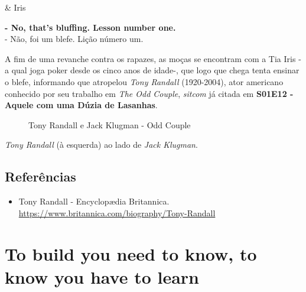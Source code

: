 \begin{tcolorbox}[enhanced,center upper,
    drop fuzzy shadow southeast, boxrule=0.3pt,
    lower separated=false, breakable,
    colframe=black!30!dialogoBorder,colback=white]
\medskip
\begin{minipage}[c]{0.16\linewidth}
   & \centering \scriptsize{Iris}
\end{minipage}
\hfill
\begin{minipage}[c]{0.8\linewidth}
  \textbf{- No, that's bluffing. Lesson number one.}\\
  - Não, foi um blefe. Lição número um.
\end{minipage}
\end{tcolorbox}

A fim de uma revanche contra os rapazes, as moças se encontram com a Tia
Iris - a qual joga poker desde os cinco anos de idade-, que logo que
chega tenta ensinar o blefe, informando que atropelou \emph{Tony
Randall} (1920-2004), ator americano conhecido por seu trabalho em
\emph{The Odd Couple}, \emph{sitcom} já citada em
\textbf{\textcolor{primarycolor}{S01E12 - Aquele com uma Dúzia de Lasanhas}}.

\begin{figure}
  \centering
    \caption{Tony Randall e Jack Klugman - Odd Couple\label{fig:tony-randall-e-jack-klugman-odd-couple}}
\end{figure}

\emph{Tony Randall} (à esquerda) ao lado de \emph{Jack Klugman}.

\hypertarget{referuxeancias-11}{%
\subsection{Referências}\label{referuxeancias-11}}

\begin{itemize}
\tightlist
\item
  \sloppy Tony Randall - Encyclopædia Britannica. \url{https://www.britannica.com/biography/Tony-Randall}
\end{itemize}

\hypertarget{to-build-you-need-to-know-to-know-you-have-to-learn}{%
\section{To build you need to know, to know you have to
learn}\label{to-build-you-need-to-know-to-know-you-have-to-learn}}

